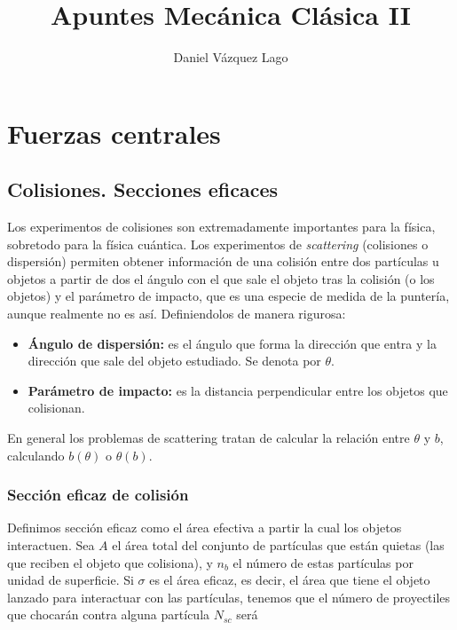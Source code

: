 \documentclass[12pt,a4paper]{book}
\author{Daniel Vázquez Lago}
\title{Apuntes Mecánica Clásica II}
\begin{document}
\maketitle

\newpage

\tableofcontents

\newpage

\chapter{Fuerzas centrales}

\section{Colisiones. Secciones eficaces}

Los experimentos de colisiones son extremadamente importantes para la física, sobretodo para la física cuántica. Los experimentos de \textit{scattering} (colisiones o dispersión) permiten obtener información de una colisión entre dos partículas u objetos a partir de dos el ángulo con el que sale el objeto tras la colisión (o los objetos) y el parámetro de impacto, que es una especie de medida de la puntería, aunque realmente no es así. Definiendolos de manera rigurosa:

\begin{itemize}
\item  \textbf{Ángulo de dispersión:} es el ángulo que forma la dirección que entra y la dirección que sale del objeto estudiado. Se denota por $\theta$.
\item \textbf{Parámetro de impacto:} es la distancia perpendicular entre los objetos que colisionan.
\end{itemize}

En general los problemas de scattering tratan de calcular la relación entre $\theta$ y $b$, calculando $b(\theta)$ o $\theta(b)$. 

\subsection{Sección eficaz de colisión}

Definimos sección eficaz como el área efectiva a partir la cual los objetos interactuen.
Sea $A$ el área total del conjunto de partículas que están quietas (las que reciben el objeto que colisiona), y $n_b$ el número de estas partículas por unidad de superficie. Si $\sigma$ es el área eficaz, es decir, el área que tiene el objeto lanzado para interactuar con las partículas, tenemos que el número de proyectiles que chocarán contra alguna partícula $N_{sc}$ será
\end{document}
